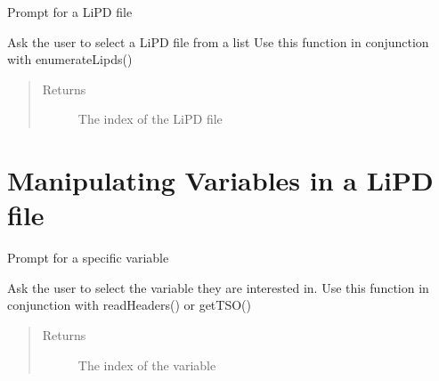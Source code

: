 \documentclass[letterpaper,10pt,english]{sphinxmanual}
\begin{document}
\begin{fulllineitems}
\label{LIPDutils:pyleoclim.promptforLipd}
Prompt for a LiPD file

Ask the user to select a LiPD file from a list
Use this function in conjunction with enumerateLipds()
\begin{quote}\begin{description}
\item[{Returns}] \leavevmode
The index of the LiPD file

\end{description}\end{quote}

\end{fulllineitems}



\section{Manipulating Variables in a LiPD file}
\label{LIPDutils:manipulating-variables-in-a-lipd-file}

\begin{fulllineitems}
\label{LIPDutils:pyleoclim.promptforVariable}
Prompt for a specific variable

Ask the user to select the variable they are interested in.
Use this function in conjunction with readHeaders() or getTSO()
\begin{quote}\begin{description}
\item[{Returns}] \leavevmode
The index of the variable

\end{description}\end{quote}

\end{fulllineitems}

\end{document}
